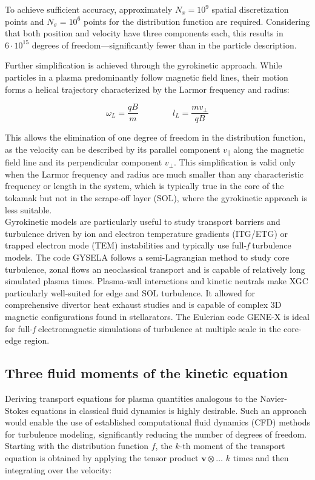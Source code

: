 To achieve sufficient accuracy, approximately $N_x = 10^9$ spatial discretization points and $N_\sigma = 10^6$ points for the distribution function are required. Considering that both position and velocity have three components each, this results in $6 \cdot 10^{15}$ degrees of freedom—significantly fewer than in the particle description. \newline

Further simplification is achieved through the gyrokinetic approach. While particles in a plasma predominantly follow magnetic field lines, their motion forms a helical trajectory characterized by the Larmor frequency and radius:

\begin{equation}
	\omega_L = \frac{qB}{m} \qquad\qquad l_L = \frac{mv_\perp}{qB}
\end{equation}

This allows the elimination of one degree of freedom in the distribution function, as the velocity can be described by its parallel component $v_\parallel$ along the magnetic field line and its perpendicular component $v_\perp$. This simplification is valid only when the Larmor frequency and radius are much smaller than any characteristic frequency or length in the system, which is typically true in the core of the tokamak but not in the scrape-off layer (SOL), where the gyrokinetic approach is less suitable. \\

Gyrokinetic models are particularly useful to study transport barriers and turbulence driven by ion and electron temperature gradients (ITG/ETG) or trapped electron mode (TEM) instabilities and typically use full-\textit{f} turbulence models. The code GYSELA\cite{grandgirard2007global,grandgirard20165d} follows a semi-Lagrangian method to study core turbulence, zonal flows an neoclassical transport and is capable of relatively long simulated plasma times. Plasma-wall interactions and kinetic neutrals make XGC\cite{hager2022} particularly well-suited for edge and SOL turbulence. It allowed for comprehensive divertor heat exhaust studies\cite{chang2017gyrokinetic} and is capable of complex 3D magnetic configurations found in stellarators\cite{cole2019verification}. The Eulerian code GENE-X\cite{goerler2011global,michels2021gene} is ideal for full-\textit{f} electromagnetic simulations of turbulence at multiple scale in the core-edge region. 


\subsection{Three fluid moments of the kinetic equation}
\label{sec:desc_fluidMoments}
Deriving transport equations for plasma quantities analogous to the Navier-Stokes equations in classical fluid dynamics is highly desirable. Such an approach would enable the use of established computational fluid dynamics (CFD) methods for turbulence modeling, significantly reducing the number of degrees of freedom. Starting with the distribution function $f$, the $k$-th moment of the transport equation is obtained by applying the tensor product $\mathbf{v} \otimes \dots$ $k$ times and then integrating over the velocity:

